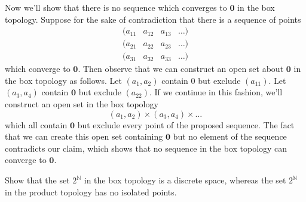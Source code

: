 \documentclass[a4paper,12pt,twoside]{hmcpset}
\begin{document}
\begin{solution}
Now we'll show that there is no sequence which converges to $\mathbf{0}$ 
in the box topology. Suppose for the sake of contradiction that there is a sequence 
of points 
$$
\begin{matrix}
    (a_{11} & a_{12} & a_{13} & \dots)\\
    (a_{21} & a_{22} & a_{23} & \dots) \\
    (a_{31} & a_{32} & a_{33} & \dots) 
  \end{matrix} $$
which converge to $\mathbf{0}$. Then observe that 
we can construct an open set about $\mathbf{0}$ in the box topology
as follows. Let $(a_1, a_2)$ contain $0$ but exclude $(a_{11})$. 
Let $(a_3, a_4)$ contain $\mathbf{0}$ but exclude $(a_{22})$. If 
we continue in this fashion, we'll construct an open set in the box topology
$$
(a_1, a_2) \times (a_3, a_4) \times \dots
$$
which all contain $\mathbf{0}$ but exclude every point of the proposed sequence.
The fact that we can create this open set containing $\mathbf{0}$ but no element 
of the sequence contradicts our claim, which shows that no sequence in the box 
topology can converge to $\mathbf{0}$.
\end{solution}

\begin{exercise}[Exercise 4.42]
Show that the set $2^\mathbb{N}$ in the box topology is a discrete
space, whereas the set $2^\mathbb{N}$ in the product topology has no
isolated points. 
\end{exercise}
\end{document}
